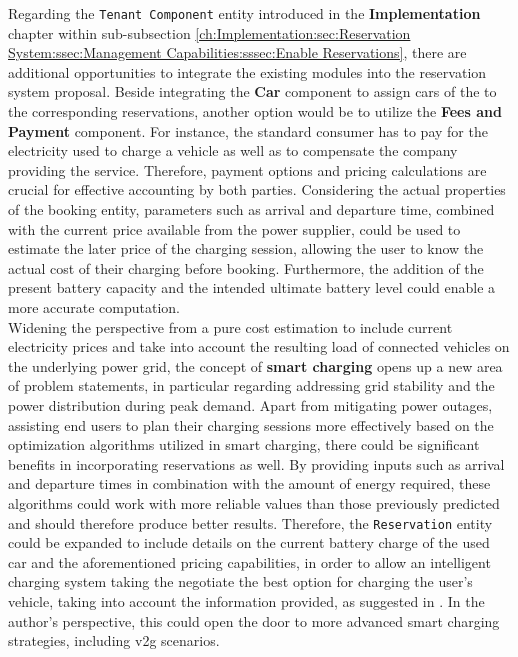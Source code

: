 Regarding the \texttt{Tenant Component} entity introduced in the \textbf{Implementation} chapter within sub-subsection \ref{ch:Implementation:sec:Reservation System:ssec:Management Capabilities:sssec:Enable Reservations}, there are additional opportunities to integrate the existing modules into the reservation system proposal. 
Beside integrating the \textbf{Car} component to assign cars of the  to the corresponding reservations, another option would be to utilize the \textbf{Fees and Payment} component.
For instance, the standard consumer has to pay for the electricity used to charge a vehicle as well as to compensate the company providing the service. Therefore, payment options and pricing calculations are crucial for effective accounting by both parties. 
Considering the actual properties of the booking entity, parameters such as arrival and departure time, combined with the current price available from the power supplier, could be used to estimate the later price of the charging session, allowing the user to know the actual cost of their charging before booking.
Furthermore, the addition of the present battery capacity and the intended ultimate battery level could enable a more accurate computation. \\
Widening the perspective from a pure cost estimation to include current electricity prices and take into account the resulting load of connected vehicles on the underlying power grid, the concept of \textbf{smart charging} opens up a new area of problem statements, in particular regarding addressing grid stability and the power distribution during peak demand.
Apart from mitigating power outages, assisting end users to plan their charging sessions more effectively based on the optimization algorithms utilized in smart charging, there could be significant benefits in incorporating reservations as well.
By providing inputs such as arrival and departure times in combination with the amount of energy required, these algorithms could work with more reliable values than those previously predicted and should therefore produce better results.
Therefore, the \texttt{Reservation} entity could be expanded to include details on the current battery charge of the used car and the aforementioned pricing capabilities, in order to allow an intelligent charging system taking the negotiate the best option for charging the user's vehicle, taking into account the information provided, as suggested in \cite{orcioni_ev_2020}.
In the author's perspective, this could open the door to more advanced smart charging strategies, including \acrshort{v2g} scenarios. \\

